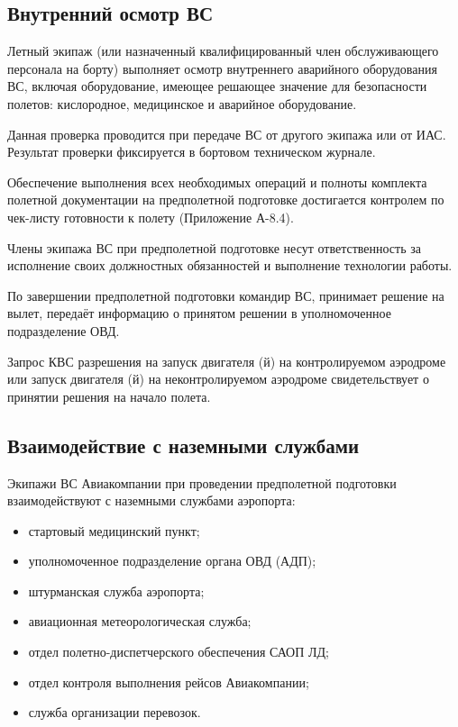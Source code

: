 \subsection{Внутренний осмотр ВС}

Летный экипаж (или назначенный квалифицированный член обслуживающего персонала на борту) выполняет осмотр внутреннего аварийного оборудования ВС, включая оборудование, имеющее решающее значение для безопасности полетов: кислородное, медицинское и аварийное оборудование.

Данная проверка проводится при передаче ВС от другого экипажа или от ИАС. Результат проверки фиксируется в бортовом техническом журнале.

Обеспечение выполнения всех необходимых операций и полноты комплекта полетной документации на предполетной подготовке достигается контролем по чек-листу готовности к полету (Приложение А-8.4). 

Члены экипажа ВС при предполетной подготовке несут ответственность за исполнение своих должностных обязанностей и выполнение технологии работы. 

По завершении предполетной подготовки командир ВС, принимает решение на вылет, передаёт информацию о принятом решении в уполномоченное подразделение ОВД.

Запрос КВС разрешения на запуск двигателя (й) на контролируемом аэродроме или запуск двигателя (й) на неконтролируемом аэродроме свидетельствует о принятии решения на начало полета.

\subsection{Взаимодействие с наземными службами}

Экипажи ВС Авиакомпании при проведении предполетной подготовки взаимодействуют с наземными службами аэропорта:
\begin{itemize}
    \item стартовый медицинский пункт; 
    \item уполномоченное подразделение органа ОВД (АДП); 
    \item штурманская служба аэропорта; 
    \item авиационная метеорологическая служба; 
    \item отдел полетно-диспетчерского обеспечения САОП ЛД; 
    \item отдел контроля выполнения рейсов Авиакомпании; 
    \item служба организации перевозок.
\end{itemize}

